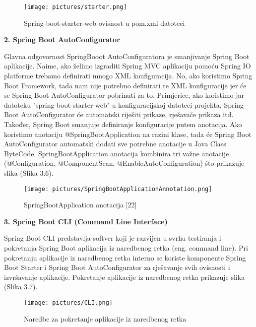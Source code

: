 \documentclass[times, utf8, zavrsni]{fer}
\begin{document}
\begin{figure}[h]
			\texttt{[image: pictures/starter.png]} %
		\centering
			\caption{Spring-boot-starter-web ovisnost u pom.xml datoteci }
			\label{fig:promjene}
\end{figure}

\textbf{2. Spring Boot AutoConfigurator} 

Glavna odgovornost SpringBooot AutoConfiguratora je smanjivanje Spring Boot aplikacije. Naime, ako želimo izgraditi Spring MVC aplikaciju pomoću Spring IO platforme trebamo definirati mnogo XML konfiguracija.  No, ako koristimo Spring Boot Framework, tada nam nije potrebno definirati te XML konfiguracije jer će se Spring Boot AutoConfigurator pobrinuti za to. Primjerice, ako koristimo jar datoteku "spring-boot-starter-web" u konfiguracijskoj datoteci projekta, Spring Boot AutoConfigurator će automatski riješiti prikaze, rješavače prikaza itd. Također, Spring Boot smanjuje definiranje konfiguracije putem anotacija. Ako koristimo anotaciju @SpringBootApplication na razini klase, tada će Spring Boot AutoConfigurator automatski dodati sve potrebne anotacije u Java Class ByteCode. SpringBootApplication anotacija kombinira tri važne anotacije (@Configuration, @ComponentScan, @EnableAutoConfiguration) što prikazuje slika (Slika 3.6).

\begin{figure}[h]
			\texttt{[image: pictures/SpringBootApplicationAnnotation.png]} %
		\centering
			\caption{SpringBootApplication anotacija [22]}
			\label{fig:promjene}
\end{figure}

 \textbf{3. Spring Boot CLI (Command Line Interface)} 
 
 Spring Boot CLI predstavlja softver koji je razvijen u svrhu testiranja i pokretanja Spring Boot aplikacija iz naredbenog retka (eng. command line). Pri pokretanju aplikacije iz naredbenog retka  interno se koriste komponente Spring Boot Starter i Spring Boot AutoConfigurator za rješavanje svih ovisnosti i izvršavanje aplikacije. Pokretanje aplikacije iz naredbenog retka prikazuje slika (Slika 3.7).
\begin{figure}[h]
			\texttt{[image: pictures/CLI.png]} %
		\centering
			\caption{Naredbe za pokretanje aplikacije iz naredbenog retka}
			\label{fig:promjene}
\end{figure}
\end{document}
